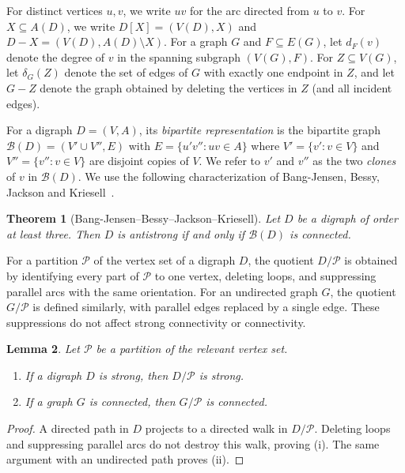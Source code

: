 \documentclass[12pt]{article}
\newtheorem{theorem}{Theorem}
\newtheorem{lemma}[theorem]{Lemma}
\theoremstyle{remark}
\newcommand{\cB}{\mathcal{B}}
\begin{document}
For distinct vertices $u,v$, we write $uv$ for the arc directed from $u$ to $v$.  For $X\subseteq A(D)$, we write $D[X]=(V(D),X)$ and $D-X=(V(D),A(D)\setminus X)$.
For a graph $G$ and $F\subseteq E(G)$, let $d_F(v)$ denote the degree of $v$ in the spanning subgraph $(V(G),F)$. For $Z\subseteq V(G)$, let $\delta_G(Z)$ denote the set of edges of $G$ with exactly one endpoint in $Z$, and let $G-Z$ denote the graph obtained by deleting the vertices in $Z$ (and all incident edges).

For a digraph $D=(V,A)$, its \emph{bipartite representation} is the
bipartite graph $\cB(D)=(V'\cup V'',E)$ with $E=\{u'v'':uv\in A\}$ where $V'=\{v':v\in V\}$ and $V''=\{v'':v\in V\}$ are disjoint copies of $V$. We refer to $v'$ and $v''$ as the two \emph{clones} of $v$ in
$\cB(D)$.  We use the following characterization of
Bang-Jensen, Bessy, Jackson and Kriesell~\cite{BBJK}.

\begin{theorem}[Bang-Jensen--Bessy--Jackson--Kriesell]
\label{thm:bipartite}
Let $D$ be a digraph of order at least three.  Then $D$ is antistrong if and only if $\cB(D)$ is connected.
\end{theorem}

For a partition $\mathcal P$ of the vertex set of a digraph $D$, the quotient $D/\mathcal P$ is obtained by identifying every part of $\mathcal P$ to one vertex, deleting loops, and suppressing parallel arcs with the same orientation.  For an undirected graph $G$, the quotient $G/\mathcal P$ is defined similarly, with parallel edges replaced by a single edge. These suppressions do not affect
strong connectivity or connectivity.

\begin{lemma}\label{lem:quotient}
Let $\mathcal P$ be a partition of the relevant vertex set.
\begin{enumerate}
\renewcommand{\labelenumi}{\textup{(\roman{enumi})}}
\item If a digraph $D$ is strong, then $D/\mathcal P$ is strong.
\item If a graph $G$ is connected, then $G/\mathcal P$ is connected.
\end{enumerate}
\end{lemma}

\begin{proof}
A directed path in $D$ projects to a directed walk in
$D/\mathcal P$. Deleting loops and suppressing parallel arcs do not destroy this walk, proving (i). The same argument with an undirected path proves (ii).
\end{proof}
\end{document}
